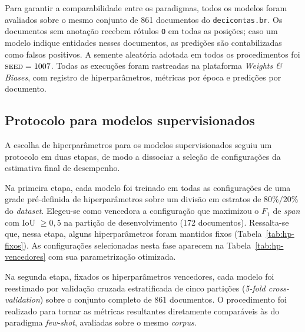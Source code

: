 Para garantir a comparabilidade entre os paradigmas, todos os modelos foram avaliados sobre o mesmo conjunto de 861 documentos do \texttt{decicontas.br}. Os documentos sem anotação recebem rótulos \texttt{O} em todas as posições; caso um modelo indique entidades nesses documentos, as predições são contabilizadas como falsos positivos. A semente aleatória adotada em todos os procedimentos foi $\textsc{seed} = 1007$. Todas as execuções foram rastreadas na plataforma \emph{Weights \& Biases}, com registro de hiperparâmetros, métricas por época e predições por documento.

\subsection{Protocolo para modelos supervisionados}
\label{sec:protocolo_supervisionado}

A escolha de hiperparâmetros para os modelos supervisionados seguiu um protocolo
em duas etapas, de modo a dissociar a seleção de configurações da estimativa
final de desempenho. 

Na primeira etapa, cada modelo foi treinado em todas as configurações de uma grade pré-definida de hiperparâmetros sobre um divisão em estratos de $80\%/20\%$ do \textit{dataset}. Elegeu-se como vencedora a configuração que maximizou o $F_1$ de \textit{span} com IoU $\geq 0{,}5$ na partição de desenvolvimento (172 documentos). Ressalta-se que, nessa etapa, alguns hiperparâmetros foram mantidos fixos (Tabela~\ref{tab:hp-fixos}). As configurações selecionadas nesta fase aparecem na  Tabela~\ref{tab:hp-vencedores} com sua parametrização otimizada.

Na segunda etapa, fixados os hiperparâmetros vencedores, cada modelo foi reestimado por validação cruzada estratificada de cinco partições (\textit{5-fold
cross-validation}) sobre o conjunto completo de 861 documentos. O procedimento foi realizado para tornar as métricas resultantes diretamente comparáveis às do paradigma \textit{few-shot}, avaliadas sobre o mesmo \textit{corpus}.

